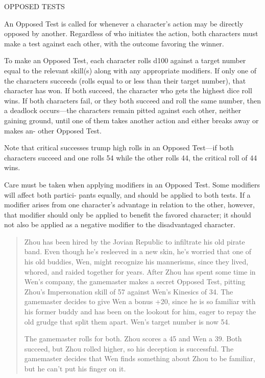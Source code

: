 OPPOSED TESTS

An Opposed Test is called for whenever a character's
action may be directly opposed by another. Regardless
of who initiates the action, both characters must make
a test against each other, with the outcome favoring
the winner.

To make an Opposed Test, each character rolls
d100 against a target number equal to the relevant
skill(s) along with any appropriate modifiers. If only
one of the characters succeeds (rolls equal to or less
than their target number), that character has won.
If both succeed, the character who gets the highest
dice roll wins. If both characters fail, or they both
succeed and roll the same number, then a deadlock
occurs—the characters remain pitted against each
other, neither gaining ground, until one of them takes
another action and either breaks away or makes an-
other Opposed Test.

Note that critical successes trump high rolls in an
Opposed Test—if both characters succeed and one rolls
54 while the other rolls 44, the critical roll of 44 wins.

Care must be taken when applying modifiers in an
Opposed Test. Some modifiers will affect both partici-
pants equally, and should be applied to both tests. If
a modifier arises from one character's advantage in
relation to the other, however, that modifier should
only be applied to benefit the favored character; it
should not also be applied as a negative modifier to
the disadvantaged character.

\begin{quotation}
  Zhou has been hired by the Jovian Republic to infiltrate his old
  pirate band. Even though he's resleeved in a new skin, he's worried
  that one of his old buddies, Wen, might recognize his mannerisms,
  since they lived, whored, and raided together for years. After Zhou
  has spent some time in Wen's company, the gamemaster makes a secret
  Opposed Test, pitting Zhou's Impersonation skill of 57 against Wen's
  Kinesics of 34. The gamemaster decides to give Wen a bonus +20,
  since he is so familiar with his former buddy and has been on the
  lookout for him, eager to repay the old grudge that split them
  apart. Wen's target number is now 54.

  The gamemaster rolls for both. Zhou scores a 45 and Wen a 39. Both
  succeed, but Zhou rolled higher, so his deception is successful. The
  gamemaster decides that Wen finds something about Zhou to be
  familiar, but he can't put his finger on it.
\end{quotation}

